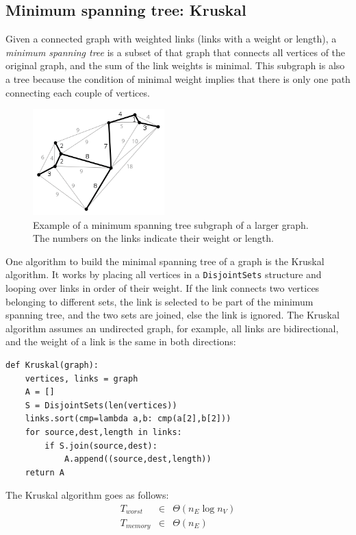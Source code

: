 \documentclass[justified,sixbynine]{tufte-book}
\def\ft{\small\tt}
\theoremstyle{plain}%
\theoremstyle{definition}
\theoremstyle{remark}
\begin{document}
\begin{fullwidth}
\subsection{Minimum spanning tree: Kruskal}


Given a connected graph with weighted links (links with a weight or length), a {\it minimum spanning tree} is a subset of that graph that connects all vertices of the original graph, and the sum of the link weights is minimal. This subgraph is also a tree because the condition of minimal weight implies that there is only one path connecting each couple of vertices.

\begin{figure}[ht]
\centering\includegraphics[width=2in]{images/mst.png}
\caption{Example of a minimum spanning tree subgraph of a larger graph. The numbers on the links indicate their weight or length.}
\end{figure}

One algorithm to build the minimal spanning tree of a graph is the Kruskal~\cite{kruskal} algorithm. It works by placing all vertices in a {\ft DisjointSets} structure and looping over links in order of their weight. If the link connects two vertices belonging to different sets, the link is selected to be part of the minimum spanning tree, and the two sets are joined, else the link is ignored. The Kruskal algorithm assumes an undirected graph, for example, all links are bidirectional, and the weight of a link is the same in both directions:

\begin{lstlisting}[caption={in file: {\ft nlib.py}}]
def Kruskal(graph):
    vertices, links = graph
    A = []
    S = DisjointSets(len(vertices))
    links.sort(cmp=lambda a,b: cmp(a[2],b[2]))
    for source,dest,length in links:
        if S.join(source,dest):
            A.append((source,dest,length))
    return A
\end{lstlisting}

The Kruskal algorithm goes as follows:
\begin{eqnarray}
T_{worst} &\in &\Theta (n_E\log n_V) \\
T_{memory} &\in &\Theta (n_E)
\end{eqnarray}


\end{fullwidth}
\end{document}

